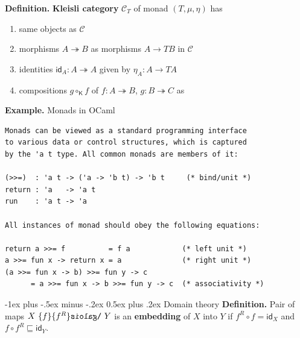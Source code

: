 \documentclass[10pt,landscape,a4paper]{article}
\makeatletter
\newcommand{\invgalois}[2]{\reflectbox{\ensuremath{\galois{\reflectbox{\ensuremath{#1}}}{\reflectbox{\ensuremath{#2}}}}}}
\renewcommand{\section}{\@startsection{section}{1}{0mm}%
                                {-1ex plus -.5ex minus -.2ex}%
                                {0.5ex plus .2ex}%
                                {\normalfont\large\bfseries}}
\makeatother
\begin{document}
\begin{multicols}{3}
\textbf{Definition.} \textbf{Kleisli category} $\mathcal C_T$ of monad $(T, \mu, \eta)$ has
\begin{enumerate}
\item same objects as $\mathcal C$
\item morphisms $A \twoheadrightarrow B$ as morphisms $A \rightarrow TB$ in $\mathcal C$
\item identities $\mathsf{id}_A : A \twoheadrightarrow A$ given by $\eta_A : A \rightarrow T A$
\item compositions $g \circ_{\textsf{K}} f$ of $f : A \twoheadrightarrow B$, $g : B \twoheadrightarrow C$ as

\end{enumerate}

\textbf{Example.} Monads in \textsf{OCaml}
\vspace{-0.2cm}
\begin{verbatim}
Monads can be viewed as a standard programming interface
to various data or control structures, which is captured
by the 'a t type. All common monads are members of it:

(>>=)  : 'a t -> ('a -> 'b t) -> 'b t     (* bind/unit *)
return : 'a   -> 'a t
run    : 'a t -> 'a

All instances of monad should obey the following equations:

return a >>= f          = f a            (* left unit *) 
a >>= fun x -> return x = a              (* right unit *) 
(a >>= fun x -> b) >>= fun y -> c
      = a >>= fun x -> b >>= fun y -> c  (* associativity *)
\end{verbatim}


\section{Domain theory}
\textbf{Definition.} Pair of maps $X ~ \invgalois{f^R}{f} ~ Y$ is an \textbf{embedding} of $X$ into $Y$ if $f^R \circ f = \mathsf{id}_X$ and $f \circ f^R \sqsubseteq \mathsf{id}_Y$.


\end{multicols}
\end{document}
